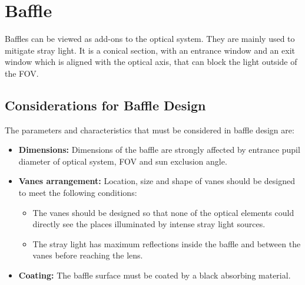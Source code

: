 \documentclass[../../main.tex]{subfiles}
\begin{document}
\section{Baffle}
Baffles can be viewed as add-ons to the optical system. They are mainly used to mitigate stray light. It is a conical section, with an entrance window and an exit window which is aligned with the optical axis, that can block the light outside of the FOV.

\subsection{Considerations for Baffle Design}
The parameters and characteristics that must be considered in baffle design are:
\begin{itemize}
    \item \textbf{Dimensions:} Dimensions of the baffle are strongly affected by entrance pupil diameter of optical system, FOV and sun exclusion angle.
    \item \textbf{Vanes arrangement:} Location, size and shape of vanes should be designed to meet the following conditions:
    \begin{itemize}
        \item The vanes should be designed so that none of the optical elements could directly see the places illuminated by intense stray light sources.
        \item The stray light has maximum reflections inside the baffle and between the vanes before reaching the lens.
    \end{itemize}
    \item \textbf{Coating:} The baffle surface must be coated by a black absorbing material.
\end{itemize}
\end{document}
